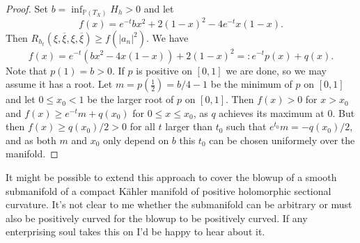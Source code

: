\documentclass[10pt,a4paper]{amsart}
\newcommand{\kk}[1]{\mathbb{#1}}
\def\ov#1{\overline{#1}}
\def\hsc{holomorphic sectional curvature}
\begin{document}
\begin{proof}
Set $b = \inf_{\kk P(T_X)} H_h > 0$ and let
$$
f(x) = e^{-t} b x^2 + 2(1-x)^2 - 4e^{-t} x(1-x).
$$
Then $R_{h_t}(\xi, \ov\xi, \xi, \ov\xi) \geq f(|a_n|^2)$.
We have
$$
f(x) = e^{-t}(b x^2 - 4 x(1-x)) + 2(1-x)^2
=: e^{-t} p(x) + q(x).
$$
Note that $p(1) = b > 0$.
If $p$ is positive on $[0,1]$ we are done, so we may assume it has a root. Let
$m = p(\frac12) = b/4-1$ be the minimum of $p$ on $[0,1]$ and let $0 \leq x_0 <
1$ be the larger root of $p$ on $[0,1]$.
Then $f(x) > 0$ for $x > x_0$ and $f(x) \geq e^{-t} m + q(x_0)$ for $0 \leq x
\leq x_0$, as $q$ achieves its maximum at $0$.
But then $f(x) \geq q(x_0)/2 > 0$ for all $t$ larger than $t_0$ such that
$e^{t_0}m = -q(x_0)/2$, and as both $m$ and $x_0$ only depend on $b$ this $t_0$
can be chosen uniformely over the manifold.
\end{proof}



It might be possible to extend this approach to cover the blowup of a smooth
submanifold of a compact K\"ahler manifold of positive \hsc.
It's not clear to me whether the submanifold can be arbitrary or must also
be positively curved for the blowup to be positively curved.
If any enterprising soul takes this on I'd be happy to hear about it.








\end{document}

